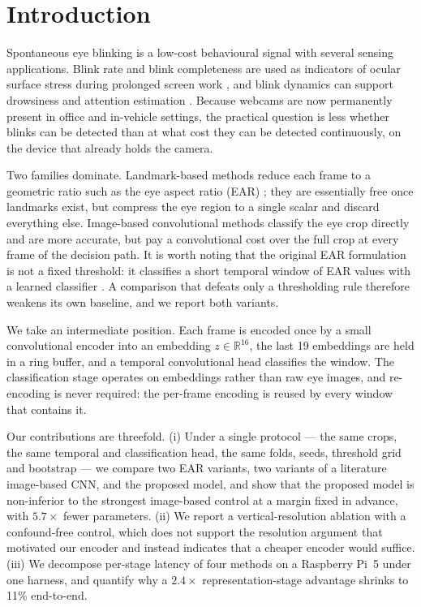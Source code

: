 \documentclass{IEEE_lsens}
\begin{document}
\section{Introduction}

Spontaneous eye blinking is a low-cost behavioural signal with several
sensing applications. Blink rate and blink completeness are used as
indicators of ocular surface stress during prolonged screen work
\cite{rosenfield2011}, and blink dynamics can support drowsiness and
attention estimation \cite{daza2020,fodor2023}. Because webcams are now permanently present in office and
in-vehicle settings, the practical question is less whether blinks can
be detected than at what cost they can be detected continuously, on the
device that already holds the camera.

Two families dominate. Landmark-based methods reduce each frame to a
geometric ratio such as the eye aspect ratio (EAR) \cite{soukupova2016};
they are essentially free once landmarks exist, but compress the eye
region to a single scalar and discard everything else. Image-based
convolutional methods classify the eye crop directly
\cite{daza2020,daza2024} and are more accurate, but pay a convolutional
cost over the full crop at every frame of the decision path. It is worth
noting that the original EAR formulation is not a fixed threshold: it
classifies a short temporal window of EAR values with a learned
classifier \cite{soukupova2016}. A comparison that defeats only a
thresholding rule therefore weakens its own baseline, and we report both
variants.

We take an intermediate position. Each frame is encoded once by a small
convolutional encoder into an embedding $z \in \mathbb{R}^{16}$, the
last 19 embeddings are held in a ring buffer, and a temporal
convolutional head classifies the window. The classification stage
operates on embeddings rather than raw eye images, and re-encoding is
never required: the per-frame encoding is reused by every window that
contains it.

Our contributions are threefold. (i) Under a single protocol --- the
same crops, the same temporal and classification head, the same folds,
seeds, threshold grid and bootstrap --- we compare two EAR variants, two
variants of a literature image-based CNN, and the proposed model, and
show that the proposed model is non-inferior to the strongest
image-based control at a margin fixed in advance, with $5.7\times$ fewer
parameters. (ii) We report a vertical-resolution ablation with a
confound-free control, which does not support the resolution argument
that motivated our encoder and instead indicates that a cheaper encoder
would suffice. (iii) We decompose per-stage latency of four methods on a
Raspberry Pi~5 under one harness, and quantify why a $2.4\times$
representation-stage advantage shrinks to 11\% end-to-end.
\end{document}
